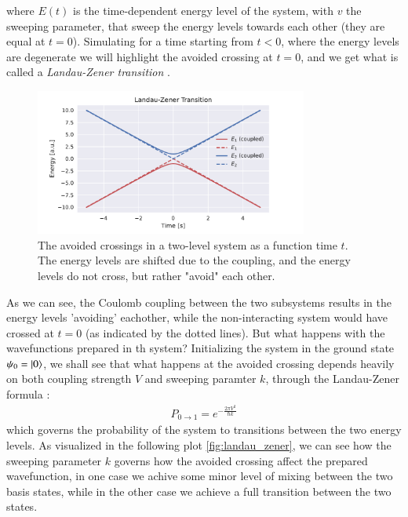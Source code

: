 \documentclass{subfiles}
\begin{document}
where $E(t)$ is the time-dependent energy level of the system, with $v$ the sweeping parameter, that sweep the energy levels towards each other (they are equal at $t=0$). Simulating for a time starting from $t<0$, where the energy levels are degenerate we will highlight the avoided crossing at $t=0$, and we get what is called a \emph{Landau-Zener transition} \cite{landau1932theorie, zener1932non}. 
\begin{figure}[h!]
    \centering
    \includegraphics[width=0.8\textwidth]{figs/avoided_crossing.pdf}
    \caption{The avoided crossings in a two-level system as a function time $t$. The energy levels are shifted due to the coupling, and the energy levels do not cross, but rather "avoid" each other.}
    \label{fig:avoided_crossings}
\end{figure}
As we can see, the Coulomb coupling between the two subsystems results in the energy levels 'avoiding' eachother, while the non-interacting system would have crossed at $t=0$ (as indicated by the dotted lines). But what happens with the wavefunctions prepared in th system? Initializing the system in the ground state $\psi_0 = \ket{0}$, we shall see that what happens at the avoided crossing depends heavily on both coupling strength $V$ and sweeping paramter $k$, through the Landau-Zener formula \cite{landau1932theorie, zener1932non}:
\begin{align*}
    P_{0\rightarrow1} = e^{-\frac{2\pi V^2}{\hbar k}}
\end{align*}
which governs the probability of the system to transitions between the two energy levels. As visualized in the following plot \eqref{fig:landau_zener}, we can see how the sweeping parameter $k$ governs how the avoided crossing affect the prepared wavefunction, in one case we achive some minor level of mixing between the two basis states, while in the other case we achieve a full transition between the two states.
\end{document}
